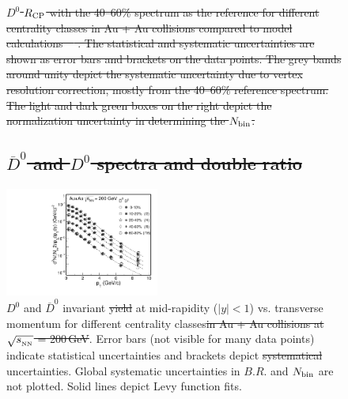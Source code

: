 \documentclass[%
 reprint,	
 amsmath,amssymb,
 aps,
 prc,
]{revtex4-1}
\providecommand{\DIFaddtex}[1]{{\protect\color{blue}\uwave{#1}}} %
\providecommand{\DIFdeltex}[1]{{\protect\color{red}\sout{#1}}}                      %
\providecommand{\DIFaddFL}[1]{\DIFadd{#1}} %
\providecommand{\DIFdelFL}[1]{\DIFdel{#1}} %
\providecommand{\DIFaddbeginFL}{} %
\providecommand{\DIFaddendFL}{} %
\providecommand{\DIFdelbeginFL}{} %
\providecommand{\DIFdelendFL}{} %
\providecommand{\DIFadd}[1]{\texorpdfstring{\DIFaddtex{#1}}{#1}} %
\providecommand{\DIFdel}[1]{\texorpdfstring{\DIFdeltex{#1}}{}} %
\begin{document}
\begin{figure}
\centering
\DIFdelbeginFL %
{%
\DIFdelFL{$D^{0}$ $R_{\rm CP}$ with the 40--60\% spectrum as the reference for different centrality classes in Au + Au collisions compared to model calculations~\mbox{%
\cite{Cao:2016gvr,LBT:private,Xu:2017obm}}%
. The statistical and systematic uncertainties are shown as error bars and brackets on the data points. The grey bands around unity depict the systematic uncertainty due to vertex resolution correction, mostly from the 40--60\% reference spectrum. The light and dark green boxes on the right depict the normalization uncertainty in determining the $N_{\rm bin}$.}}

\subsection{%
\DIFdel{$\overline{D}^{0}$ and $D^{0}$ spectra and double ratio}}
\addtocounter{subsection}{-1}%

\DIFdelendFL \includegraphics[width=0.45\textwidth]{fig/D0_spectra_bothposneg.pdf}
\caption{$D^{0}$ and $\overline{D}^{0}$ invariant \DIFdelbeginFL \DIFdelFL{yield }\DIFdelendFL \DIFaddbeginFL \DIFaddFL{yields }\DIFaddendFL at mid-rapidity (\DIFdelbeginFL \DIFdelFL{$|y|<1$}\DIFdelendFL \DIFaddbeginFL \DIFaddFL{$|y|$\,$<$\,1}\DIFaddendFL ) vs. transverse momentum for different centrality classes\DIFdelbeginFL \DIFdelFL{in Au + Au collisions at $\sqrt{s_{_{\rm NN}}}$ = 200\,GeV}\DIFdelendFL . Error bars (not visible for many data points) indicate statistical uncertainties and brackets depict \DIFdelbeginFL \DIFdelFL{systematical }\DIFdelendFL \DIFaddbeginFL \DIFaddFL{systematic }\DIFaddendFL uncertainties. Global systematic uncertainties in $B.R.$ and $N_{\rm bin}$ are not plotted. Solid lines depict Levy function fits.}
\label{fig:D0_spectra_bothposneg} 
\end{figure}
\end{document}
